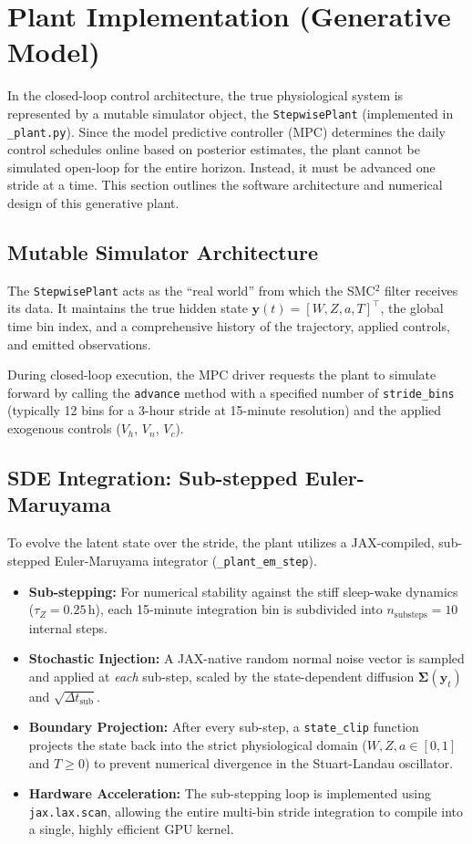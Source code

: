 \documentclass[11pt,a4paper]{article}
\begin{document}
\section{Plant Implementation (Generative Model)}

In the closed-loop control architecture, the true physiological system is represented by a mutable simulator object, the \texttt{StepwisePlant} (implemented in \texttt{\_plant.py}). Since the model predictive controller (MPC) determines the daily control schedules online based on posterior estimates, the plant cannot be simulated open-loop for the entire horizon. Instead, it must be advanced one stride at a time. This section outlines the software architecture and numerical design of this generative plant.

\subsection{Mutable Simulator Architecture}
The \texttt{StepwisePlant} acts as the ``real world'' from which the SMC$^2$ filter receives its data. It maintains the true hidden state $\mathbf{y}(t) = [W, Z, a, T]^\top$, the global time bin index, and a comprehensive history of the trajectory, applied controls, and emitted observations.

During closed-loop execution, the MPC driver requests the plant to simulate forward by calling the \texttt{advance} method with a specified number of \texttt{stride\_bins} (typically 12 bins for a 3-hour stride at 15-minute resolution) and the applied exogenous controls ($V_h$, $V_n$, $V_c$).

\subsection{SDE Integration: Sub-stepped Euler-Maruyama}
To evolve the latent state over the stride, the plant utilizes a JAX-compiled, sub-stepped Euler-Maruyama integrator (\texttt{\_plant\_em\_step}).
\begin{itemize}
    \item \textbf{Sub-stepping:} For numerical stability against the stiff sleep-wake dynamics ($\tau_Z = 0.25$\,h), each 15-minute integration bin is subdivided into $n_{\text{substeps}} = 10$ internal steps.
    \item \textbf{Stochastic Injection:} A JAX-native random normal noise vector is sampled and applied at \textit{each} sub-step, scaled by the state-dependent diffusion $\boldsymbol{\Sigma}(\mathbf{y}_t)$ and $\sqrt{\Delta t_{\text{sub}}}$.
    \item \textbf{Boundary Projection:} After every sub-step, a \texttt{state\_clip} function projects the state back into the strict physiological domain ($W, Z, a \in [0, 1]$ and $T \geq 0$) to prevent numerical divergence in the Stuart-Landau oscillator.
    \item \textbf{Hardware Acceleration:} The sub-stepping loop is implemented using \texttt{jax.lax.scan}, allowing the entire multi-bin stride integration to compile into a single, highly efficient GPU kernel.
\end{itemize}
\end{document}
